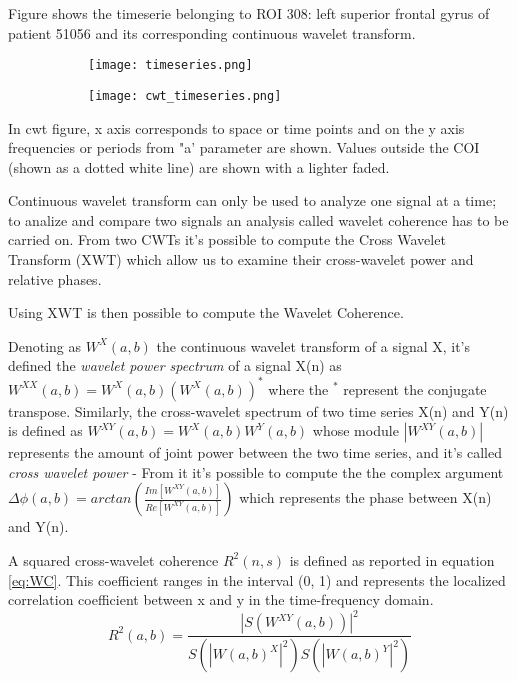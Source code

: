 \documentclass[a4paper,11pt]{article}
\begin{document}
Figure shows the timeserie belonging to ROI 308: left superior frontal gyrus of patient 51056 and its corresponding continuous wavelet transform.

\begin{figure}
\begin{subfigure}{0.5\textwidth}
\texttt{[image: timeseries.png]}
\caption{}
\label{}
\end{subfigure}
\begin{subfigure}{0.5\textwidth}
\texttt{[image: cwt\_timeseries.png]}
\end{subfigure}
\caption{}
\label{}
\end{figure}

In cwt figure, x axis corresponds to space or time points and on the y axis frequencies or periods from "a' parameter are shown.
Values outside the COI (shown as a dotted white line) are shown with a lighter faded.




Continuous wavelet transform can only be used to analyze one signal at a time; to analize and compare two signals an analysis called wavelet coherence has to be carried on.
From two CWTs it's possible to compute the Cross Wavelet Transform (XWT) which allow us to examine their cross-wavelet power and relative phases.

Using XWT is then possible to compute the Wavelet Coherence.

Denoting as $W^{X}(a, b)$ the continuous wavelet transform of a signal X, it's defined the \emph{wavelet power spectrum} of a signal X(n) as $W^{XX}(a, b) = W^X(a, b) \left(W^X(a, b)\right)^{\ast}$ where the $^{\ast}$ represent the conjugate transpose.
Similarly, the cross-wavelet spectrum of two time series X(n) and Y(n) is defined as $W^{XY}(a, b) = W^X(a, b)W^Y(a, b)$ whose module $|W^{XY}(a, b)|$ represents the amount of joint power between the two time series, and it's called \emph{cross wavelet power}
-
From it it's possible to compute the the complex argument $\Delta \phi (a, b) = arctan\left(\frac{Im\left[ W^{XY}(a, b)\right]}{Re\left[ W^{XY}(a, b)\right]} \right)$ which represents the phase between X(n) and Y(n).

A squared cross-wavelet coherence $R^2(n, s)$ is defined as reported in equation \ref{eq:WC}. This coefficient ranges in the interval (0, 1) and represents the localized correlation coefficient between x and y in the time-frequency domain.
\begin{equation}
R^2(a, b) = \frac{|S(W^{XY}(a,b))|^2}{S(|W(a,b)^X|^2) S(|W(a,b)^Y|^2)}
\label{eq:WC}
\end{equation}
\end{document}
